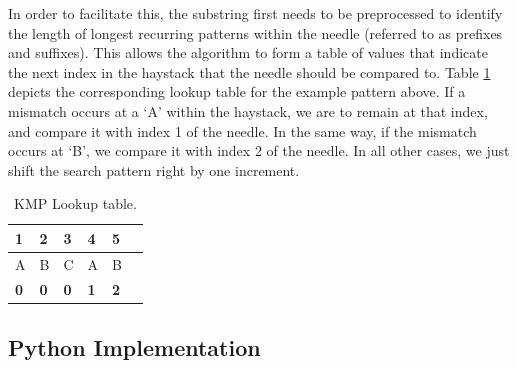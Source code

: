 \noindent
In order to facilitate this, the substring first needs to be preprocessed to identify the length of longest recurring patterns within the needle (referred to as prefixes and suffixes). This allows the algorithm to form a table of values that indicate the next index in the haystack that the needle should be compared to. Table \ref{tab:kmp_table} depicts the corresponding lookup table for the example pattern above. If a mismatch occurs at a `A' within the haystack, we are to remain at that index, and compare it with index 1 of the needle. In the same way, if the mismatch occurs at `B', we compare it with index 2 of the needle. In all other cases, we just shift the search pattern right by one increment. 



\begin{table}[H]
    \centering
    \begin{tabular}{llllll}
    1 & 2 & 3 & 4 & 5 \\ \hline
    \multicolumn{1}{|l|}{A} & \multicolumn{1}{l|}{B} & \multicolumn{1}{l|}{C} & \multicolumn{1}{l|}{A} & \multicolumn{1}{l|}{B} \\ \hline
    \multicolumn{1}{|l|}{\textbf{0}} & \multicolumn{1}{l|}{\textbf{0}} & \multicolumn{1}{l|}{\textbf{0}} & \multicolumn{1}{l|}{\textbf{1}} & \multicolumn{1}{l|}{\textbf{2}} \\ \hline
    \end{tabular}
    \caption{KMP Lookup table.}
    \label{tab:kmp_table}
\end{table}

\subsection*{Python Implementation}

